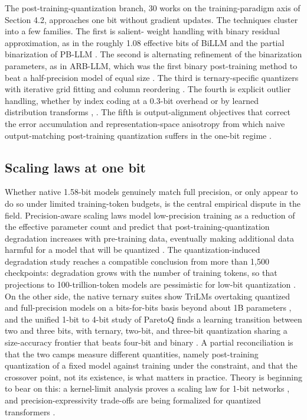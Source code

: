 \documentclass[11pt]{article}
\begin{document}
The post-training-quantization branch, 30 works on the training-paradigm axis of
Section 4.2, approaches one bit without gradient updates. The techniques cluster into a few families. The first is salient-
weight handling with binary residual approximation, as in the roughly 1.08 effective
bits of BiLLM \cite{Huang2024-BiLLM} and the partial binarization of PB-LLM
\cite{Shang2023-PBLLM}. The second is alternating refinement of the binarization parameters,
as in ARB-LLM, which was the first binary post-training method to beat a half-precision
model of equal size \cite{Li2024-ARBLLM}. The third is ternary-specific quantizers with
iterative grid fitting and column reordering \cite{Yan2025-PT2LLM,Xiao2025-PTQTP}. The
fourth is explicit outlier handling, whether by index coding at a 0.3-bit overhead
\cite{Li2025-ICQuant} or by learned distribution transforms \cite{Ye2025-DBellQuant},
\cite{Zhao2026-BWLA}. The fifth is output-alignment objectives that correct the error
accumulation and representation-space anisotropy from which naive output-matching
post-training quantization suffers in the one-bit regime \cite{Hoang2025-OutputAlign1bit}.

\subsection{Scaling laws at one bit}

Whether native 1.58-bit models genuinely match full precision, or only appear to do so
under limited training-token budgets, is the central empirical dispute in the field.
Precision-aware scaling laws model low-precision training as a reduction of the
effective parameter count and predict that post-training-quantization degradation
increases with pre-training data, eventually making additional data harmful for a model
that will be quantized \cite{Kumar2024-ScalingLawsPrecision}. The quantization-induced
degradation study reaches a compatible conclusion from more than 1,500 checkpoints:
degradation grows with the number of training tokens, so that projections to
100-trillion-token models are pessimistic for low-bit quantization
\cite{Ouyang2024-QiDScaling}. On the other side, the native ternary suites show TriLMs
overtaking quantized and full-precision models on a bits-for-bits basis beyond about 1B
parameters \cite{Kaushal2024-Spectra,Vaidhya2025-Spectra11}, and the unified 1-bit to
4-bit study of ParetoQ finds a learning transition between two and three bits, with
ternary, two-bit, and three-bit quantization sharing a size-accuracy frontier that
beats four-bit and binary \cite{Liu2025-ParetoQ}. A partial reconciliation is that the two
camps measure different quantities, namely post-training quantization of a fixed model
against training under the constraint, and that the crossover point, not its existence,
is what matters in practice. Theory is beginning to bear on this: a kernel-limit
analysis proves a scaling law for 1-bit networks \cite{Daliri2024-Theory1bit}, and
precision-expressivity trade-offs are being formalized for quantized transformers
\cite{Anon2026-EveryBitCounts,Anon2026-ExpressivePowerWQ}.
\end{document}
